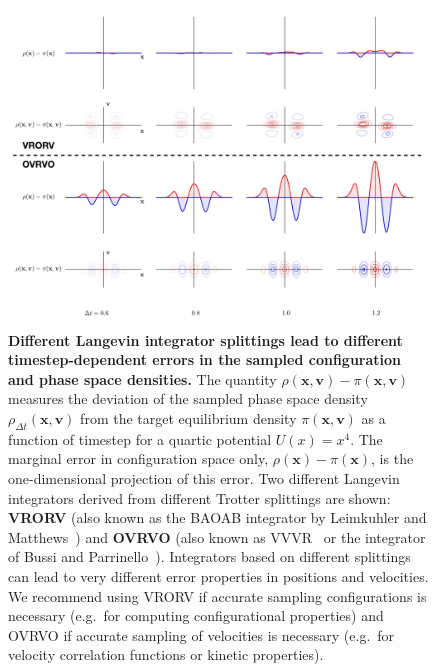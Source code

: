 \documentclass[aip,jcp,preprint,superscriptaddress,floatfix]{revtex4-1}
\newcommand{\x}{\mathbf{x}}
\newcommand{\vel}{\mathbf{v}}
\newcommand{\splitting}[1]{{\bf \sf #1}} %
\begin{document}
\begin{figure}[h]
\centering
\includegraphics[width=1.0\textwidth]{figures/quartic_eq_joint_dist_array_w_x_marginals.jpg}

\caption{{\bf Different Langevin integrator splittings lead to different timestep-dependent errors in the sampled configuration and phase space densities.}
The quantity $\rho(\x,\vel) - \pi(\x,\vel)$ measures the deviation of the sampled phase space density $\rho_{\Delta t}(\x,\vel)$ from the target equilibrium density $\pi(\x,\vel)$ as a function of timestep for a quartic potential $U(x) = x^4$.
The marginal error in configuration space only, $\rho(\x) - \pi(\x)$, is the one-dimensional projection of this error.
Two different Langevin integrators derived from different Trotter splittings are shown: \splitting{VRORV} (also known as the BAOAB integrator by Leimkuhler and Matthews~\cite{gBAOAB,BAOAB}) and \splitting{OVRVO} (also known as VVVR~\cite{VVVR} or the integrator of Bussi and Parrinello~\cite{BussiParrinello}).
Integrators based on different splittings can lead to very different error properties in positions and velocities.
We recommend using VRORV if accurate sampling configurations is necessary (e.g.~for computing configurational properties) and OVRVO if accurate sampling of velocities is necessary (e.g.~for velocity correlation functions or kinetic properties).
\label{figure:timestep-dependent-error}
}
\end{figure}  
\end{document}
